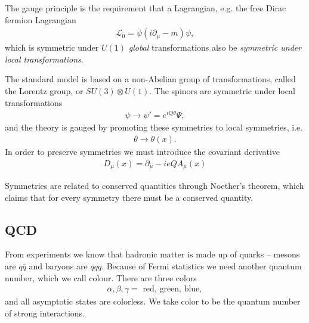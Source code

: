 \documentclass[11pt]{article}
\begin{document}
\begin{multicols}{2}
\begin{flushleft}
The gauge principle is the requirement that a Lagrangian, e.g. the free Dirac fermion Lagrangian
\begin{align*}
\mathcal{L}_0 = \bar{\psi}(i \partial_{\mu} - m) \psi,
\end{align*}
which is symmetric under $U(1)$ \textit{global} transformations also be \textit{symmetric under local transformations}.
\end{flushleft}

\begin{flushleft}
The standard model is based on a non-Abelian group of transformations, called the Lorentz group, or $SU(3) \otimes U(1)$. The spinors are symmetric under local transformations
\begin{align*}
\psi \rightarrow \psi'=e^{iQ\theta} \Psi,
\end{align*}
and the theory is gauged by promoting these symmetries to local symmetries, i.e.
\begin{align*}
\theta \rightarrow \theta (x).
\end{align*}
In order to preserve symmetries we must introduce the covariant derivative
\begin{align}
D_{\mu}(x) = \partial_{\mu} - ieQA_{\mu}(x)
\end{align}
\end{flushleft}

\begin{flushleft}
Symmetries are related to conserved quantities through Noether's theorem, which claims that for every symmetry there must be a conserved quantity.
\end{flushleft}



\subsection{QCD}
\begin{flushleft}
From experiments we know that hadronic matter is made up of quarks -- mesons are $q \bar{q}$ and baryons are $qqq$. Because of Fermi statistics we need another quantum number, which we call colour. There are three colors
\begin{align*}
\alpha, \beta, \gamma = \text{ red, green, blue},
\end{align*}
and all asymptotic states are colorless. We take color to be the quantum number of strong interactions.
\end{flushleft}


\end{multicols}
\end{document}

